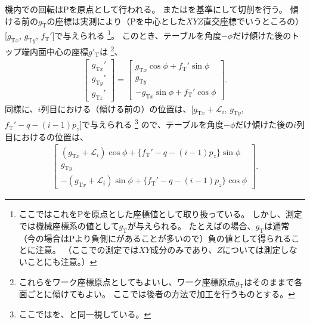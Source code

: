 \clearpage
機内での回転は\TableCenter Pを原点として行われる。
また\DimpleMilling は\TopIDCenter を基準にして切削を行う。
傾ける前の\TopIDCenter $g_\mathrm T$の座標は実測により（Pを中心とした$XYZ$直交座標でいうところの）[$g_{\mathrm Tx}$, $g_{\mathrm Ty}$, $f_\mathrm T'$]で与えられる
\footnote{ここではこれを\TableCenter Pを原点とした座標値として取り扱っている。
しかし、測定では機械座標系の値として$g_\mathrm T$が与えられる。
たとえば\Dimple の場合、$g_\mathrm T$は通常（今の場合は\TableCenter Pより負側に\CurvatureCenter があることが多いので）負の値として得られることに注意。
（ここでの測定では$XY$成分のみであり、$Z$については測定しないことにも注意。）}。
このとき、テーブルを角度$-\phi$だけ傾けた後のトップ端内面中心の座標$g'_\mathrm T$は
\footnote{これらをワーク座標原点としてもよいし、ワーク座標原点$g_\mathrm T$はそのままで各面ごとに傾けてもよい。
ここでは後者の方法で加工を行うものとする。}、
\begin{align}
  \label{eq:afterPhiTCenterFromO}
  \left[
  \begin{array}{c}
    g_{\mathrm Tx}'\\
    g_{\mathrm Ty}'\\
    g_{\mathrm Tz}'
  \end{array}
  \right]
  =\left[
   \begin{array}{c}
     g_{\mathrm Tx}\cos\phi+f_\mathrm T'\sin\phi\\
     g_{\mathrm Ty}\\
     -g_{\mathrm Tx}\sin\phi+f_\mathrm T'\cos\phi
   \end{array}
   \right].
   \end{align}
同様に、$i$列目における（傾ける前の）\CurvatureCenter の位置は、[$g_{\mathrm Tx}+\mathcal L_i$, $g_{\mathrm Ty}$, $f_\mathrm T'-q-(i-1)p_z$]で与えられる
\footnote{ここでは\TopCurvatureCenter を、\TopIDCenter と同一視している。}
ので、テーブルを角度$-\phi$だけ傾けた後の$i$列目における\CurvatureCenter の位置は、
\begin{align*}
  \left[
  \begin{array}{c}
    (g_{\mathrm Tx}+\mathcal L_i)\cos\phi+\{f_\mathrm T'-q-(i-1)p_z\}\sin\phi\\
    g_{\mathrm Ty}\\
    -(g_{\mathrm Tx}+\mathcal L_i)\sin\phi+\{f_\mathrm T'-q-(i-1)p_z\}\cos\phi
  \end{array}
  \right].
\end{align*}
